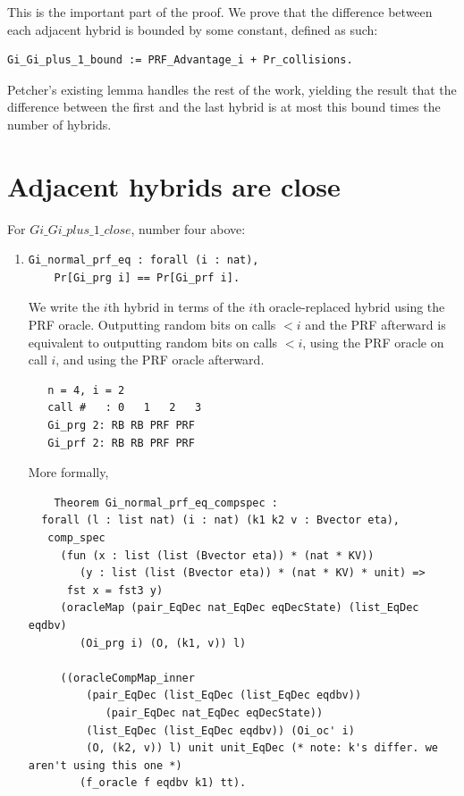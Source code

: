 \documentclass[12pt,lot, lof]{puthesis}
\begin{document}
{\begin{enumerate}
This is the important part of the proof. We prove that the difference between each adjacent hybrid is bounded by some constant, defined as such:

\begin{lstlisting}
Gi_Gi_plus_1_bound := PRF_Advantage_i + Pr_collisions.
\end{lstlisting}

Petcher's existing lemma handles the rest of the work, yielding the result that the difference between the first and the last hybrid is at most this bound times the number of hybrids.

\end{enumerate} 


\section{Adjacent hybrids are close} \label{sec:adjacent_hybrids_are_close}

For $Gi\_Gi\_plus\_1\_close$, number four above:
\begin{enumerate}
\par
\item \begin{lstlisting}
Gi_normal_prf_eq : forall (i : nat),
    Pr[Gi_prg i] == Pr[Gi_prf i].
    \end{lstlisting}
    
    We write the $i$th hybrid in terms of the $i$th oracle-replaced hybrid using the PRF oracle. Outputting random bits on calls $< i$ and the PRF afterward is equivalent to outputting random bits on calls $< i$, using the PRF oracle on call $i$, and using the PRF oracle afterward. 
    \begin{lstlisting}
   n = 4, i = 2
   call #   : 0   1   2   3
   Gi_prg 2: RB RB PRF PRF
   Gi_prf 2: RB RB PRF PRF
    \end{lstlisting}
    
    More formally,
    \begin{lstlisting}
    Theorem Gi_normal_prf_eq_compspec :
  forall (l : list nat) (i : nat) (k1 k2 v : Bvector eta),
   comp_spec
     (fun (x : list (list (Bvector eta)) * (nat * KV))
        (y : list (list (Bvector eta)) * (nat * KV) * unit) =>
      fst x = fst3 y)
     (oracleMap (pair_EqDec nat_EqDec eqDecState) (list_EqDec eqdbv)
        (Oi_prg i) (O, (k1, v)) l)
        
     ((oracleCompMap_inner
         (pair_EqDec (list_EqDec (list_EqDec eqdbv))
            (pair_EqDec nat_EqDec eqDecState))
         (list_EqDec (list_EqDec eqdbv)) (Oi_oc' i) 
         (O, (k2, v)) l) unit unit_EqDec (* note: k's differ. we aren't using this one *)
        (f_oracle f eqdbv k1) tt).
    \end{lstlisting}
    

\end{enumerate}}
\end{document}
